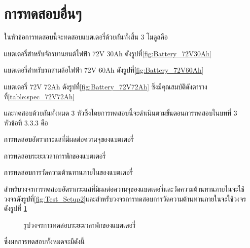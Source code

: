 \section{การทดสอบอื่นๆ}
ในหัวข้อการทดสอบนี้จะทดสอบแบตเตอรี่ด้วยกันทั้งสิ้น 3 โมดูลคือ
\begin{itemize}
 {\item แบตเตอรี่สำหรับจักรยานยนต์ไฟฟ้า 72V 30Ah ดังรูปที่\ref{fig:Battery_72V30Ah}}
 {\item แบตเตอรี่สำหรับรถสามล้อไฟฟ้า 72V 60Ah ดังรูปที่\ref{fig:Battery_72V60Ah}}
 {\item แบตเตอรี่ 72V 72Ah ดังรูปที่\ref{fig:Battery_72V72Ah} ซึ่งมีคุณสมบัติดังตารางที่\ref{table:spec_72V72Ah}}
\end{itemize}
และทดสอบด้วยกันทั้งหมด 3 หัวซึ่งโดยการทดสอบนี้จะดำเนินตามขั้นตอนการทดสอบในบทที่ 3 หัวข้อที่ 3.3.3 คือ
\begin{itemize}
 {\item การทดสอบอัตรากระแสที่มีผลต่อความจุของแบตเตอรี่}
 {\item การทดสอบระยะเวลาการพักของแบตเตอรี่}
 {\item การทดสอบการวัดความต้านทานภายในของแบตเตอรี่}
\end{itemize}
สำหรับวงจรการทดสอบอัตรากระแสที่มีผลต่อความจุของแบตเตอรี่และวัดความต้านทานภายในจะใช้วงจรดังรูปที่\ref{fig:Test_Setup2}และสำหรับวงจรการทดสอบการวัดความต้านทานภายในจะใช้วงจรดังรูปที่
\ref{fig:Test_Setup3}
\begin{center}
	\begin{figure}[H]
		\centering
		\captionsetup{justification=centering,margin=2cm}
		\caption{รูปวงจรการทดสอบระยะเวลาพักของแบตเตอรี่}
		\label{fig:Test_Setup3}
	\end{figure}
\end{center}
ซึ่งผลการทดสอบทั้งหมดจะมีดังนี้ 
\pagebreak
